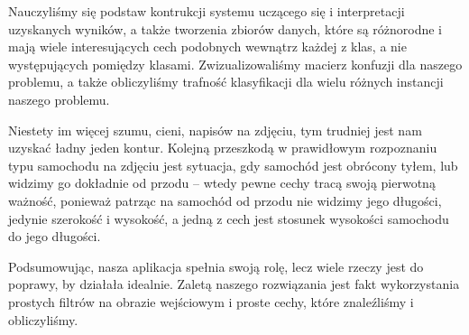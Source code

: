 \documentclass{article}
\begin{document}
Nauczyliśmy się podstaw kontrukcji systemu uczącego się i interpretacji uzyskanych wyników, a także tworzenia zbiorów danych, które są różnorodne i mają wiele interesujących cech podobnych wewnątrz każdej z klas, a nie występujących pomiędzy klasami. Zwizualizowaliśmy macierz konfuzji dla naszego problemu, a także obliczyliśmy trafność klasyfikacji dla wielu różnych instancji naszego problemu.

Niestety im więcej szumu, cieni, napisów na zdjęciu, tym trudniej jest nam uzyskać ładny jeden kontur. Kolejną przeszkodą w prawidłowym rozpoznaniu typu samochodu na zdjęciu jest sytuacja, gdy samochód jest obrócony tyłem, lub widzimy go dokładnie od przodu -- wtedy pewne cechy tracą swoją pierwotną ważność, ponieważ patrząc na samochód od przodu nie widzimy jego długości, jedynie szerokość i wysokość, a jedną z cech jest stosunek wysokości samochodu do jego długości.

Podsumowując, nasza aplikacja spełnia swoją rolę, lecz wiele rzeczy jest do poprawy, by działała idealnie. Zaletą naszego rozwiązania jest fakt wykorzystania prostych filtrów na obrazie wejściowym i proste cechy, które znaleźliśmy i obliczyliśmy.
\end{document}
